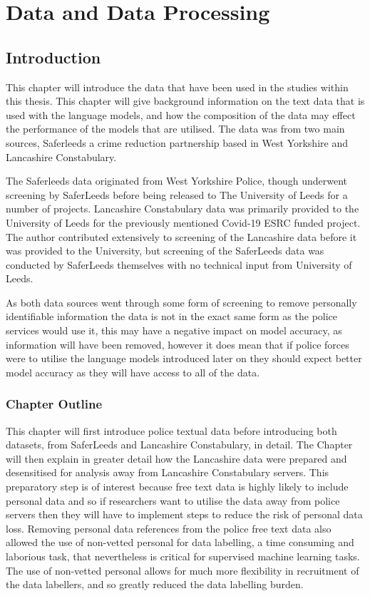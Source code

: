 \chapter{Data and Data Processing}


\section{Introduction} 

This chapter will introduce the data that have been used in the studies within this thesis. This chapter will give background information on the text data that is used with the language models, and how the composition of the data may effect the performance of the models that are utilised. The data was from two main sources, Saferleeds a crime reduction partnership based in West Yorkshire and Lancashire Constabulary. 

The Saferleeds data originated from West Yorkshire Police, though underwent screening by SaferLeeds before being released to The University of Leeds for a number of projects. Lancashire Constabulary data was primarily provided to the University of Leeds for the previously mentioned Covid-19 ESRC funded project. The author contributed extensively to screening of the Lancashire data before it was provided to the University, but screening of the SaferLeeds data was conducted by SaferLeeds themselves with no technical input from University of Leeds.  

As both data sources went through some form of screening to remove personally identifiable information the data is not in the exact same form as the police services would use it, this may have a negative impact on model accuracy, as information will have been removed, however it does mean that if police forces were to utilise the language models introduced later on they should expect better model accuracy as they will have access to all of the data.

\subsection{Chapter Outline}
This chapter will first introduce police textual data  before introducing both datasets, from SaferLeeds and Lancashire Constabulary, in detail. The Chapter will then explain in greater detail how the Lancashire data were prepared and desensitised for analysis away from Lancashire Constabulary servers. This preparatory step is of interest because free text data is highly likely to include personal data and so if researchers want to utilise the data away from police servers then they will have to implement steps to reduce the risk of personal data loss. Removing personal data references from the police free text data also allowed the use of non-vetted personal for data labelling, a time consuming and laborious task, that nevertheless is critical for supervised machine learning tasks. The use of non-vetted personal allows for much more flexibility in recruitment of the data labellers, and so greatly reduced the data labelling burden. 

